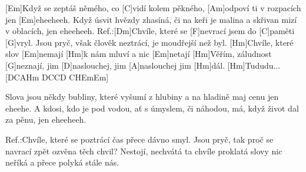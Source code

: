 
[Em]Když se zeptáš němého, co [C]vidí kolem pěkného,
[Am]odpoví ti v rozpacích jen [Em]eheeheeh.
Když úsvit hvězdy zhasíná, či na keři je malina
a skřivan mizí v oblacích, jen eheeheeh.
Ref.:[Dm]Chvíle, které se [F]nevrací jsem do [C]paměti [G]vryl.
Jsou pryč, však člověk neztrácí, je moudřejší než byl.
[Hm]Chvíle, které slov [Em]nemají
[Hm]k nám mluví a nic [Em]netají
[Hm]Věřím, záludnost [G]neznají,
jim [D]naslouchej, jim [A]naslouchej jim [Hm]dál.
[Hm]Tududu...[DCAHm DCCD CHEmEm]

Slova jsou někdy bubliny, které vyšumí z hlubiny
a na hladině maj cenu jen eheehe.
A kdosi, kdo je pod vodou, ať s úmyslem, či náhodou,
má, když život dal za pěnu, jen eheeheeh.

Ref.:Chvíle, které se poztrácí čas přece dávno smyl.
Jsou pryč, tak proč se navrací zpět ozvěna těch chvil?
Nestojí, nechvátá
ta chvíle proklatá
slovy nic neříká
a přece polyká stále nás.